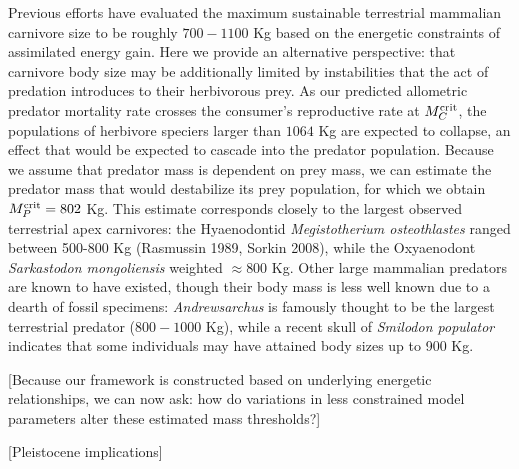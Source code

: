 \documentclass[onecolumn,preprintnumbers,amsmath,amssymb,superscriptaddress]{revtex4}
\begin{document}
Previous efforts have evaluated the maximum sustainable terrestrial mammalian carnivore size to be roughly $700-1100$ Kg based on the energetic constraints of assimilated energy gain.
Here we provide an alternative perspective: that carnivore body size may be additionally limited by instabilities that the act of predation introduces to their herbivorous prey.
As our predicted allometric predator mortality rate crosses the consumer's reproductive rate at $M_C^{\rm crit}$, the populations of herbivore speciers larger than $1064$ Kg are expected to collapse, an effect that would be expected to cascade into the predator population.
Because we assume that predator mass is dependent on prey mass, we can estimate the predator mass that would destabilize its prey population, for which we obtain $M_P^{\rm crit} = 802$ Kg.
This estimate corresponds closely to the largest observed terrestrial apex carnivores: the Hyaenodontid \emph{Megistotherium osteothlastes} ranged between 500-800 Kg (Rasmussin 1989, Sorkin 2008), while the Oxyaenodont \emph{Sarkastodon mongoliensis} weighted $\approx 800$ Kg.
Other large mammalian predators are known to have existed, though their body mass is less well known due to a dearth of fossil specimens: \emph{Andrewsarchus} is famously thought to be the largest terrestrial predator ($800-1000$ Kg), while a recent skull of \emph{Smilodon populator} indicates that some individuals may have attained body sizes up to 900 Kg.

[Because our framework is constructed based on underlying energetic relationships, we can now ask: how do variations in less constrained model parameters alter these estimated mass thresholds?]

[Pleistocene implications]
\end{document}
